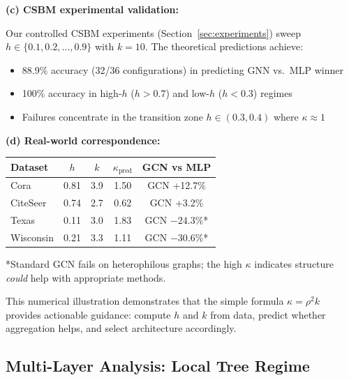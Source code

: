 \begin{example}
\textbf{(c) CSBM experimental validation:}

Our controlled CSBM experiments (Section~\ref{sec:experiments}) sweep $h \in \{0.1, 0.2, \ldots, 0.9\}$ with $k = 10$. The theoretical predictions achieve:
\begin{itemize}
    \item 88.9\% accuracy (32/36 configurations) in predicting GNN vs.\ MLP winner
    \item 100\% accuracy in high-$h$ ($h > 0.7$) and low-$h$ ($h < 0.3$) regimes
    \item Failures concentrate in the transition zone $h \in (0.3, 0.4)$ where $\kappa \approx 1$
\end{itemize}

\textbf{(d) Real-world correspondence:}

\begin{center}
\begin{tabular}{lcccc}
\toprule
\textbf{Dataset} & $h$ & $k$ & $\kappa_{\text{pred}}$ & \textbf{GCN vs MLP} \\
\midrule
Cora & 0.81 & 3.9 & 1.50 & GCN +12.7\% \\
CiteSeer & 0.74 & 2.7 & 0.62 & GCN +3.2\% \\
Texas & 0.11 & 3.0 & 1.83 & GCN $-24.3\%$* \\
Wisconsin & 0.21 & 3.3 & 1.11 & GCN $-30.6\%$* \\
\bottomrule
\end{tabular}
\end{center}
*Standard GCN fails on heterophilous graphs; the high $\kappa$ indicates structure \textit{could} help with appropriate methods.

This numerical illustration demonstrates that the simple formula $\kappa = \rho^2 k$ provides actionable guidance: compute $h$ and $k$ from data, predict whether aggregation helps, and select architecture accordingly.
\end{example}

\subsection{Multi-Layer Analysis: Local Tree Regime}
\label{subsec:multilayer_rigorous}

